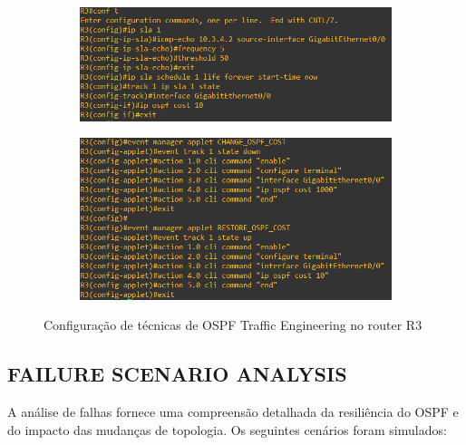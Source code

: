 \documentclass[11pt,english, openright, oneside]{book}
\begin{document}
\begin{figure}[h]
  \centering
  \begin{subfigure}{.8\textwidth}
    \centering
      \includegraphics[width=1\linewidth]{imagens/Tarefa6/28.ospf_traffic_engineering_R3_1.png}
  \end{subfigure}
  \begin{subfigure}{.8\textwidth}
    \centering
      \includegraphics[width=1\linewidth]{imagens/Tarefa6/28.ospf_traffic_engineering_R3_2.png}
  \end{subfigure}
  \caption{Configuração de técnicas de OSPF Traffic Engineering no router R3}
  \label{fig:config43}
\end{figure}
\vspace{0.2cm}


\pagebreak
\subsection{FAILURE SCENARIO ANALYSIS}
\vspace{0.2cm}

A análise de falhas fornece uma compreensão detalhada da resiliência do OSPF e do impacto das mudanças de topologia. Os seguintes cenários foram simulados:
\end{document}
